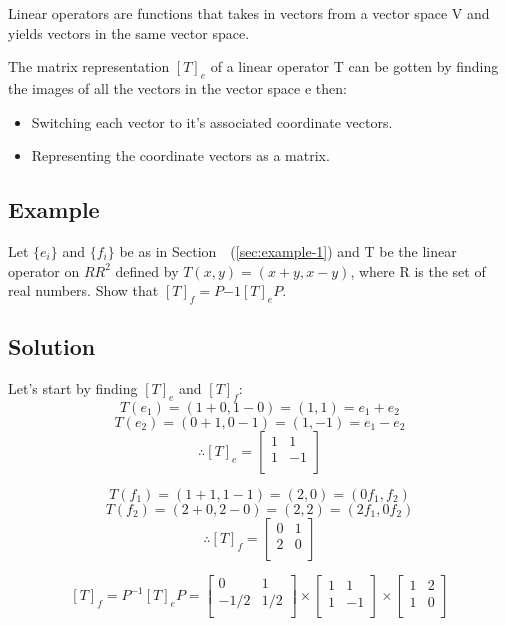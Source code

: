 \documentclass{book}
\begin{document}
Linear operators are functions that takes in vectors from a vector space V and yields vectors in the same vector space.

The matrix representation \({[T]}_e\) of a linear operator T can be gotten by finding the images of all the vectors in the vector space e then:

\begin{itemize}
	\item Switching each vector to it's associated coordinate vectors.
	\item Representing the coordinate vectors as a matrix.
\end{itemize}

\subsection{Example}

Let \(\{e_i\}\) and \(\{f_i\}\) be as in Section~~(\ref{sec:example-1}) and T be the linear operator on \(RR^2\) defined by \(T(x, y) = (x + y, x - y)\), where R is the set of real numbers. Show that \({[T]}_f = P{-1} {[T]}_e P\).

\subsection*{Solution}

Let's start by finding \({[T]}_e\) and \({[T]}_f\):
\[T(e_1) = (1 + 0, 1 - 0) = (1, 1) = e_1 + e_2\]
\[T(e_2) = (0 + 1, 0 - 1) = (1, -1) = e_1 - e_2\]
\[\therefore {[T]}_e = \begin{bmatrix}
	1 & 1 \\
	1 & -1 \\
\end{bmatrix}\]

\[T(f_1) = (1 + 1, 1 - 1) = (2, 0) = (0f_1, f_2)\]
\[T(f_2) = (2 + 0, 2 - 0) = (2, 2) = (2f_1, 0f_2)\]
\[\therefore {[T]}_f = \begin{bmatrix}
	0 & 1 \\
	2 & 0 \\
\end{bmatrix}\]

\[{[T]}_f = P^{-1} {[T]}_e P = \begin{bmatrix}
	0 & 1 \\
	-1/2 & 1/2 \\
\end{bmatrix}
\times
\begin{bmatrix}
	1 & 1 \\
	1 & -1 \\
\end{bmatrix}
\times
\begin{bmatrix}
	1 & 2 \\
	1 & 0 \\
\end{bmatrix}\]
\end{document}
